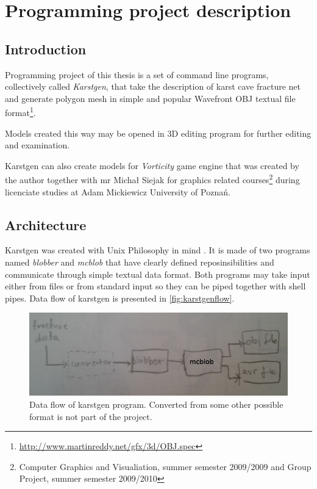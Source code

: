 \chapter{Programming project description}
\label{chap:project}
\section{Introduction}

Programming project of this thesis is a set of command line programs, collectively
called \emph{Karstgen}, that take
the description of karst cave fracture net and generate polygon mesh in
simple and popular Wavefront OBJ textual file format\footnote{\url{http://www.martinreddy.net/gfx/3d/OBJ.spec}}.

Models created this way may be opened in 3D editing program for further editing
and examination.

Karstgen can also create models for \emph{Vorticity} game engine that was created
by the author together with mr Michał Siejak for graphics related courses\footnote{Computer
  Graphics and Visualiation, summer semester 2009/2009 and Group Project, summer
semester 2009/2010} during licenciate studies at Adam Mickiewicz University of
Poznań.

\section{Architecture}

Karstgen was created with Unix Philosophy in mind \parencite{raymond2003art}.
It is made of two programs named \emph{blobber} and \emph{mcblob} that have
clearly defined reposinsibilities and communicate through simple textual data
format.  Both programs may take input either from files or from standard input
so they can be piped together with shell pipes. Data flow of karstgen is
presented in \autoref{fig:karstgenflow}.
\begin{figure}[ht]
  \begin{center}
    \includegraphics[width=\textwidth]{chapters/project/karstgenflow.jpg}
  \end{center}
  \caption{Data flow of karstgen program. Converted from some other possible
  format is not part of the project.}
  \label{fig:karstgenflow}
\end{figure}

